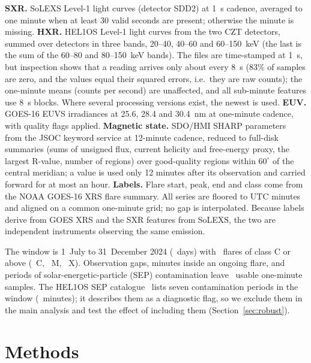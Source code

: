 \documentclass[conference]{IEEEtran}
\begin{document}
\textbf{SXR.} SoLEXS Level-1 light curves (detector SDD2) at 1~s cadence, averaged to one minute when at least 30 valid seconds are present; otherwise the minute is missing. \textbf{HXR.} HEL1OS Level-1 light curves from the two CZT detectors, summed over detectors in three bands, 20--40, 40--60 and 60--150~keV (the last is the sum of the 60--80 and 80--150~keV bands). The files are time-stamped at 1~s, but inspection shows that a reading arrives only about every 8~s (83\% of samples are zero, and the values equal their squared errors, i.e.\ they are raw counts); the one-minute means (counts per second) are unaffected, and all sub-minute features use 8~s blocks. Where several processing versions exist, the newest is used. \textbf{EUV.} GOES-16 EUVS irradiances at 25.6, 28.4 and 30.4~nm at one-minute cadence, with quality flags applied. \textbf{Magnetic state.} SDO/HMI SHARP parameters~\cite{scherrer2012,bobra2014} from the JSOC keyword service at 12-minute cadence, reduced to full-disk summaries (sums of unsigned flux, current helicity and free-energy proxy, the largest R-value, number of regions) over good-quality regions within $60^{\circ}$ of the central meridian; a value is used only 12 minutes after its observation and carried forward for at most an hour. \textbf{Labels.} Flare start, peak, end and class come from the NOAA GOES-16 XRS flare summary. All series are floored to UTC minutes and aligned on a common one-minute grid; no gap is interpolated. Because labels derive from GOES XRS and the SXR features from SoLEXS, the two are independent instruments observing the same emission.

The window is 1~July to 31~December 2024 (\NumDays\ days) with \NumFlaresAll\ flares of class C or above (\NumFlaresC\ C, \NumFlaresM\ M, \NumFlaresX\ X). Observation gaps, minutes inside an ongoing flare, and periods of solar-energetic-particle (SEP) contamination leave \NumUsable\ usable one-minute samples. The HEL1OS SEP catalogue~\cite{sepcat} lists seven contamination periods in the window (\NumSepMin\ minutes); it describes them as a diagnostic flag, so we exclude them in the main analysis and test the effect of including them (Section~\ref{sec:robust}).

\section{Methods}
\end{document}

